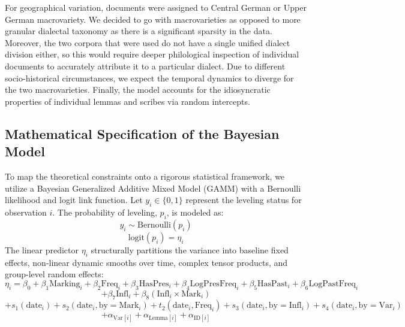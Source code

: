 For geographical variation, documents were assigned to Central German or Upper German macrovariety. We decided to go with macrovarieties as opposed to more granular dialectal taxonomy as there is a significant sparsity in the data. Moreover, the two corpora that were used do not have a single unified dialect division either, so this would require deeper philological inspection of individual documents to accurately attribute it to a particular dialect. Due to different socio-historical circumstances, we expect the temporal dynamics to diverge for the two macrovarieties. Finally, the model accounts for the idiosyncratic properties of individual lemmas and scribes via random intercepts. 

\subsection{Mathematical Specification of the Bayesian Model}

To map the theoretical constraints onto a rigorous statistical framework, we utilize a Bayesian Generalized Additive Mixed Model (GAMM) with a Bernoulli likelihood and logit link function. Let $y_i \in \{0, 1\}$ represent the leveling status for observation $i$. The probability of leveling, $p_i$, is modeled as:
$$y_i \sim \text{Bernoulli}(p_i)$$
$$\text{logit}(p_i) = \eta_i$$
The linear predictor $\eta_i$ structurally partitions the variance into baseline fixed effects, non-linear dynamic smooths over time, complex tensor products, and group-level random effects:
$$\eta_i = \beta_0 + \beta_1 \text{Marking}_i + \beta_2 \text{Freq}_i + \beta_3 \text{HasPres}_i + \beta_4 \text{LogPresFreq}_i + \beta_5 \text{HasPast}_i + \beta_6 \text{LogPastFreq}_i$$ 
$$+ \beta_7 \text{Infl}_i + \beta_8 (\text{Infl}_i \times \text{Mark}_i)$$
$$+ s_1(\text{date}_i) + s_2(\text{date}_i, \text{by} = \text{Mark}_i) + t_2(\text{date}_i, \text{Freq}_i) + s_3(\text{date}_i, \text{by} = \text{Infl}_i) + s_4(\text{date}_i, \text{by} = \text{Var}_i)$$
$$+ \alpha_{\text{Var}[i]} + \alpha_{\text{Lemma}[i]} + \alpha_{\text{ID}[i]}$$

